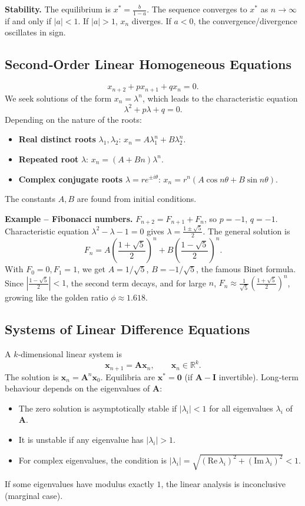 \documentclass[12pt,a4paper]{book}
\begin{document}
\textbf{Stability.} The equilibrium is $x^* = \frac{b}{1-a}$. The sequence converges to $x^*$ as $n\to\infty$ if and only if $|a|<1$. If $|a|>1$, $x_n$ diverges. If $a<0$, the convergence/divergence oscillates in sign.

\subsection{Second‑Order Linear Homogeneous Equations}
\[
x_{n+2} + p x_{n+1} + q x_n = 0.
\]
We seek solutions of the form $x_n = \lambda^n$, which leads to the characteristic equation
\[
\lambda^2 + p\lambda + q = 0.
\]
Depending on the nature of the roots:
\begin{itemize}
    \item \textbf{Real distinct roots} $\lambda_1, \lambda_2$: $x_n = A\lambda_1^n + B\lambda_2^n$.
    \item \textbf{Repeated root} $\lambda$: $x_n = (A + B n) \lambda^n$.
    \item \textbf{Complex conjugate roots} $\lambda = r e^{\pm i\theta}$: $x_n = r^n (A\cos n\theta + B\sin n\theta)$.
\end{itemize}
The constants $A,B$ are found from initial conditions.

\textbf{Example – Fibonacci numbers.}
$F_{n+2} = F_{n+1} + F_n$, so $p=-1$, $q=-1$. Characteristic equation $\lambda^2 - \lambda -1 =0$ gives $\lambda = \frac{1\pm\sqrt{5}}{2}$. The general solution is
\[
F_n = A\left(\frac{1+\sqrt{5}}{2}\right)^n + B\left(\frac{1-\sqrt{5}}{2}\right)^n.
\]
With $F_0=0,F_1=1$, we get $A = 1/\sqrt{5}$, $B = -1/\sqrt{5}$, the famous Binet formula. Since $|\frac{1-\sqrt{5}}{2}| < 1$, the second term decays, and for large $n$, $F_n \approx \frac{1}{\sqrt{5}}\left(\frac{1+\sqrt{5}}{2}\right)^n$, growing like the golden ratio $\phi \approx 1.618$.

\subsection{Systems of Linear Difference Equations}
A $k$‑dimensional linear system is
\[
\mathbf{x}_{n+1} = \mathbf{A} \mathbf{x}_n, \qquad \mathbf{x}_n \in \mathbb{R}^k.
\]
The solution is $\mathbf{x}_n = \mathbf{A}^n \mathbf{x}_0$. Equilibria are $\mathbf{x}^* = \mathbf{0}$ (if $\mathbf{A}-\mathbf{I}$ invertible). Long‑term behaviour depends on the eigenvalues of $\mathbf{A}$:
\begin{itemize}
    \item The zero solution is asymptotically stable if $|\lambda_i| < 1$ for all eigenvalues $\lambda_i$ of $\mathbf{A}$.
    \item It is unstable if any eigenvalue has $|\lambda_i| > 1$.
    \item For complex eigenvalues, the condition is $|\lambda_i| = \sqrt{(\text{Re}\,\lambda_i)^2+(\text{Im}\,\lambda_i)^2} < 1$.
\end{itemize}
If some eigenvalues have modulus exactly $1$, the linear analysis is inconclusive (marginal case).
\end{document}
